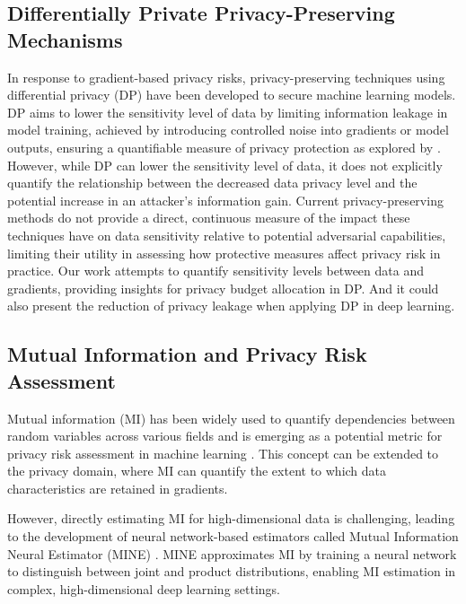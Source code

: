 \subsection{Differentially Private Privacy-Preserving Mechanisms}

In response to gradient-based privacy risks, privacy-preserving techniques using differential privacy (DP) have been developed to secure machine learning models. DP aims to lower the sensitivity level of data by limiting information leakage in model training, achieved by introducing controlled noise into gradients or model outputs, ensuring a quantifiable measure of privacy protection as explored by \cite{abadi2016deep} \cite{jayaraman2019evaluating} \cite{nasr2020improving}. However, while DP can lower the sensitivity level of data, it does not explicitly quantify the relationship between the decreased data privacy level and the potential increase in an attacker’s information gain. Current privacy-preserving methods do not provide a direct, continuous measure of the impact these techniques have on data sensitivity relative to potential adversarial capabilities, limiting their utility in assessing how protective measures affect privacy risk in practice. Our work attempts to quantify sensitivity levels between data and gradients, providing insights for privacy budget allocation in DP. And it could also present the reduction of privacy leakage when applying DP in deep learning.

\subsection{Mutual Information and Privacy Risk Assessment}

Mutual information (MI) has been widely used to quantify dependencies between random variables across various fields and is emerging as a potential metric for privacy risk assessment in machine learning \cite{wang2021improving} \cite{he2021drmi} \cite{gao2023detecting}. This concept can be extended to the privacy domain, where MI can quantify the extent to which data characteristics are retained in gradients.

However, directly estimating MI for high-dimensional data is challenging, leading to the development of neural network-based estimators called Mutual Information Neural Estimator (MINE) \cite{belghazi2018mine}. MINE approximates MI by training a neural network to distinguish between joint and product distributions, enabling MI estimation in complex, high-dimensional deep learning settings. 

